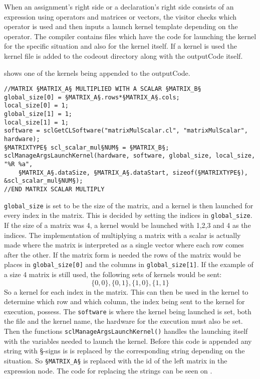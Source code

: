 When an assignment's right side or a declaration's right side consists of an expression using operators and matrices or vectors, the visitor checks which operator is used and then inputs a launch kernel template depending on the operator.
The compiler contains files which have the code for launching the kernel for the specific situation and also for the kernel itself.
If a kernel is used the kernel file is added to the codeout directory along with the outputCode itself.

 shows one of the kernels being appended to the outputCode.

\begin{lstlisting}[caption=SimpleOpenCL launch of a kernel calculating a matrix or vector multiplied with a scalar.,numbers=none,frame=tlrb,label={lst:kernelLaunch}]
//MATRIX §MATRIX_A§ MULTIPLIED WITH A SCALAR §MATRIX_B§
global_size[0] = §MATRIX_A§.rows*§MATRIX_A§.cols;
local_size[0] = 1;
global_size[1] = 1;
local_size[1] = 1;
software = sclGetCLSoftware("matrixMulScalar.cl", "matrixMulScalar", hardware);
§MATRIXTYPE§ scl_scalar_mul§NUM§ = §MATRIX_B§;
sclManageArgsLaunchKernel(hardware, software, global_size, local_size, "%R %a",
    §MATRIX_A§.dataSize, §MATRIX_A§.dataStart, sizeof(§MATRIXTYPE§), &scl_scalar_mul§NUM§);
//END MATRIX SCALAR MULTIPLY
\end{lstlisting}

\texttt{global\_size} is set to be the size of the matrix, and a kernel is then launched for every index in the matrix.
This is decided by setting the indices in \texttt{global\_size}.
If the size of a matrix was 4, a kernel would be launched with 1,2,3 and 4 as the indices.
The implementation of multiplying a matrix with a scalar is actually made where the matrix is interpreted as a single vector where each row comes after the other.
If the matrix form is needed the rows of the matrix would be places in \texttt{global\_size[0]} and the columns in \texttt{global\_size[1]}.
If the example of a size 4 matrix is still used, the following sets of kernels would be sent:
\begin{equation}
\{0,0\}, \{0,1\}, \{1,0\}, \{1,1\}
\end{equation}
So a kernel for each index in the matrix.
This can then be used in the kernel to determine which row and which column, the index being sent to the kernel for execution, possess.
The \texttt{software} is where the kernel being launched is set, both the file and the kernel name, the hardware for the execution must also be set.
Then the functions \texttt{sclManageArgsLaunchKernel()} handles the launching itself with the variables needed to launch the kernel.
Before this code is appended any string with  \S-signs is is replaced by the corresponding string depending on the situation.
So \texttt{§MATRIX\_A§} is replaced with the id of the left matrix in the expression node.
The code for replacing the strings can be seen on .

